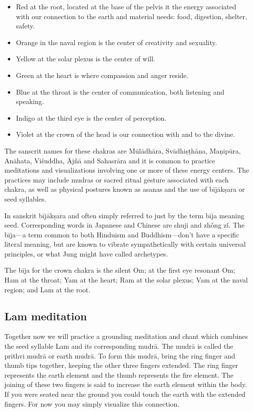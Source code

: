 \documentclass[12pt]{article}
\begin{document}
\begin{itemize}
  \item Red at the root, located at the base of the pelvis it the energy associated with our connection to the earth and material needs: food, digestion, shelter, safety.
  \item Orange in the naval region is the center of creativity and sexuality.
  \item Yellow at the solar plexus is the center of will.
  \item Green at the heart is where compassion and anger reside.
  \item Blue at the throat is the center of communication, both listening and speaking.
  \item Indigo at the third eye is the center of perception.
  \item Violet at the crown of the head is our connection with and to the divine.
\end{itemize}

The sanscrit names for these chakras are Mūlādhāra, Svādhiṣṭhāna, Maṇipūra, Anāhata, Viśuddha, Ājñā and Sahasrāra and it is common to practice meditations and visualizations involving one or more of these energy centers. The practices may include mudras or sacred ritual gesture associated with each chakra, as well as physical postures known as asanas and the use of bījākṣara or seed syllables.

In sanskrit bījākṣara and often simply referred to just by the term bīja meaning seed. Corresponding words in Japanese and Chinese are shuji and zhǒng zǐ. The bīja—a term common to both Hinduism and Buddhism—don't have a specific literal meaning, but are known to vibrate sympathetically with certain universal principles, or what Jung might have called archetypes.

The bīja for the crown chakra is the silent Om; at the first eye resonant Om; Ham at the throat; Yam at the heart; Ram at the solar plexus; Vam at the naval region; and Lam at the root.

\subsection*{Lam meditation}

Together now we will practice a grounding meditation and chant which combines the seed syllable Lam and its corresponding mudrā. The mudrā is called the prithvi mudrā or earth mudrā. To form this mudrā, bring the ring finger and thumb tips together, keeping the other three fingers extended. The ring finger represents the earth element and the thumb represents the fire element. The joining of these two fingers is said to increase the earth element within the body. If you were seated near the ground you could touch the earth with the extended fingers. For now you may simply visualize this connection.
\end{document}
